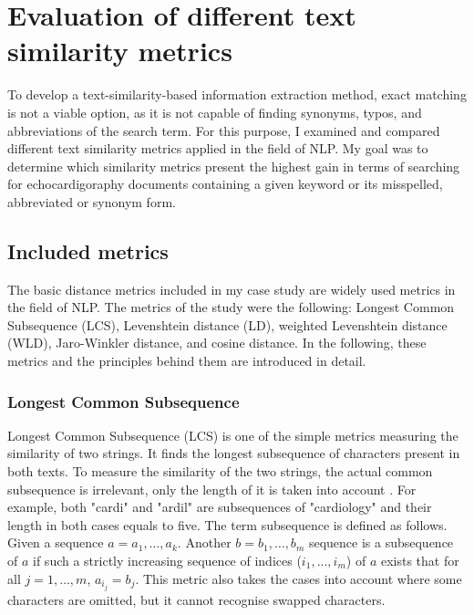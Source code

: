 

\section{Evaluation of different text similarity metrics}
\label{sec:metrics}

To develop a text-similarity-based information extraction method, exact matching is not a viable option, as it is not capable of finding synonyms, typos, and abbreviations of the search term. For this purpose, I examined and compared different text similarity metrics applied in the field of NLP. My goal was to determine which similarity metrics present the highest gain in terms of searching for echocardigoraphy documents containing a given keyword or its misspelled, abbreviated or synonym form. 

\subsection{Included metrics}

The basic distance metrics included in my case study are widely used metrics in the field of NLP. The metrics of the study were the following: Longest Common Subsequence (LCS), Levenshtein distance (LD), weighted Levenshtein distance (WLD), Jaro-Winkler distance, and cosine distance. In the following, these metrics and the principles behind them are introduced in detail.

\subsubsection*{Longest Common Subsequence}

Longest Common Subsequence (LCS) is one of the simple metrics measuring the similarity of two strings. It finds the longest subsequence of characters present in both texts. To measure the similarity of the two strings, the actual common subsequence is irrelevant, only the length of it is taken into account \cite{lonardi2010string}. For example, both "cardi" and "ardil" are subsequences of "cardiology" and their length in both cases equals to five. The term subsequence is defined as follows. Given a sequence $a=a_1,  \dots, a_k$. Another $b=b_1, \dots,b_m$ sequence is a subsequence of $a$ if such a strictly increasing sequence of indices ($i_1,\dots,i_m$) of $a$ exists that for all $j=1,\dots,m$, $a_{i_j}=b_j$. This metric also takes the cases into account where some characters are omitted, but it cannot recognise swapped characters.


